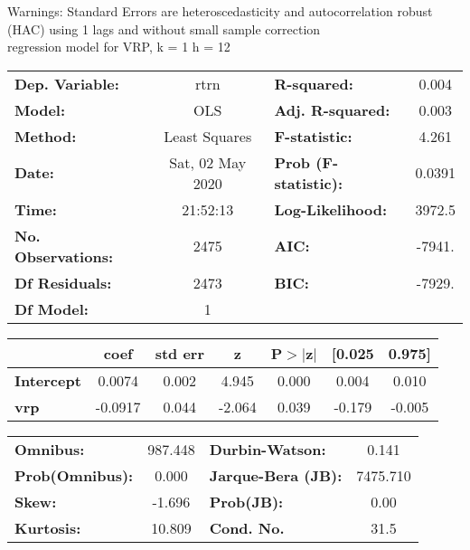 Warnings: \newline
 [1] Standard Errors are heteroscedasticity and autocorrelation robust (HAC) using 1 lags and without small sample correction\\ 

regression model for VRP, k = 1 h = 12\begin{center}
\begin{tabular}{lclc}
\toprule
\textbf{Dep. Variable:}    &       rtrn       & \textbf{  R-squared:         } &     0.004   \\
\textbf{Model:}            &       OLS        & \textbf{  Adj. R-squared:    } &     0.003   \\
\textbf{Method:}           &  Least Squares   & \textbf{  F-statistic:       } &     4.261   \\
\textbf{Date:}             & Sat, 02 May 2020 & \textbf{  Prob (F-statistic):} &   0.0391    \\
\textbf{Time:}             &     21:52:13     & \textbf{  Log-Likelihood:    } &    3972.5   \\
\textbf{No. Observations:} &        2475      & \textbf{  AIC:               } &    -7941.   \\
\textbf{Df Residuals:}     &        2473      & \textbf{  BIC:               } &    -7929.   \\
\textbf{Df Model:}         &           1      & \textbf{                     } &             \\
\bottomrule
\end{tabular}
\begin{tabular}{lcccccc}
                   & \textbf{coef} & \textbf{std err} & \textbf{z} & \textbf{P$> |$z$|$} & \textbf{[0.025} & \textbf{0.975]}  \\
\midrule
\textbf{Intercept} &       0.0074  &        0.002     &     4.945  &         0.000        &        0.004    &        0.010     \\
\textbf{vrp}       &      -0.0917  &        0.044     &    -2.064  &         0.039        &       -0.179    &       -0.005     \\
\bottomrule
\end{tabular}
\begin{tabular}{lclc}
\textbf{Omnibus:}       & 987.448 & \textbf{  Durbin-Watson:     } &    0.141  \\
\textbf{Prob(Omnibus):} &   0.000 & \textbf{  Jarque-Bera (JB):  } & 7475.710  \\
\textbf{Skew:}          &  -1.696 & \textbf{  Prob(JB):          } &     0.00  \\
\textbf{Kurtosis:}      &  10.809 & \textbf{  Cond. No.          } &     31.5  \\
\bottomrule
\end{tabular}
\end{center}

